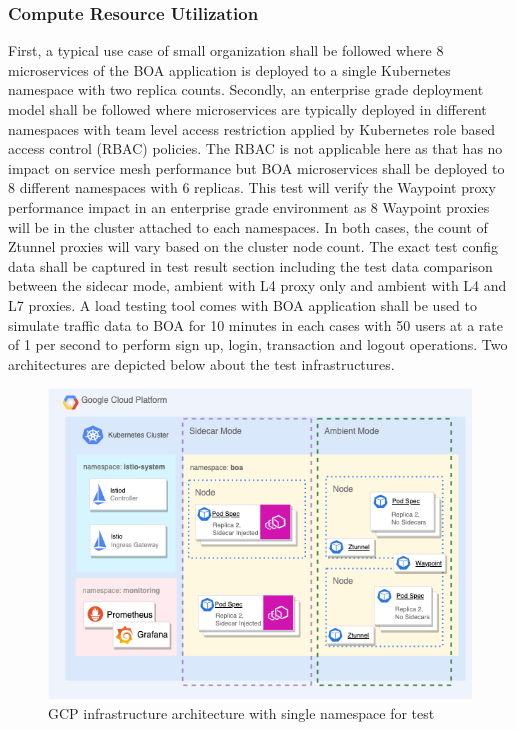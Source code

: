 \subsubsection{Compute Resource Utilization}
First, a typical use case of small organization shall be followed where 8 microservices of the BOA application is deployed to a single Kubernetes namespace with two replica counts. Secondly, an enterprise grade deployment model shall be followed where microservices are typically deployed in different namespaces with team level access restriction applied by Kubernetes role based access control (RBAC) policies. The RBAC is not applicable here as that has no impact on service mesh performance but BOA microservices shall be deployed to 8 different namespaces with 6 replicas. This test will verify the Waypoint proxy performance impact in an enterprise grade environment as 8 Waypoint proxies will be in the cluster attached to each namespaces. In both cases, the count of Ztunnel proxies will vary based on the cluster node count. The exact test config data shall be captured in test result section including the test data comparison between the sidecar mode, ambient with L4 proxy only and ambient with L4 and L7 proxies. A load testing tool comes with BOA application shall be used to simulate traffic data to BOA for 10 minutes in each cases with 50 users at a rate of 1 per second to perform sign up, login, transaction and logout operations. Two architectures are depicted below about the test infrastructures.

\begin{figure}[ht!]
    \centering
    \includegraphics[width=0.7\linewidth]{resources/single-ns-test-infra.drawio.png}
    \caption{GCP infrastructure architecture with single namespace for test}
    \label{method:singleNsInfraArch}
\end{figure}

